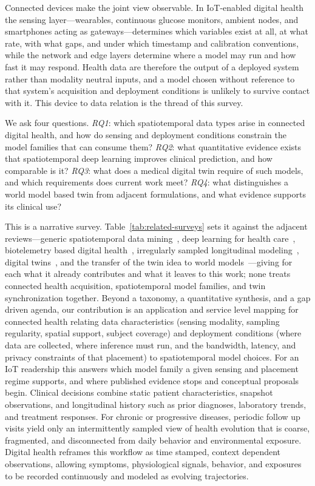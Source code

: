 \documentclass[journal]{IEEEtran}
\begin{document}
Connected devices make the joint view observable. In IoT-enabled digital health the sensing layer---wearables, continuous glucose monitors, ambient nodes, and smartphones acting as gateways---determines which variables exist at all, at what rate, with what gaps, and under which timestamp and calibration conventions, while the network and edge layers determine where a model may run and how fast it may respond. Health data are therefore the output of a deployed system rather than modality neutral inputs, and a model chosen without reference to that system's acquisition and deployment conditions is unlikely to survive contact with it. This device to data relation is the thread of this survey.

We ask four questions. \emph{RQ1}: which spatiotemporal data types arise in connected digital health, and how do sensing and deployment conditions constrain the model families that can consume them? \emph{RQ2}: what quantitative evidence exists that spatiotemporal deep learning improves clinical prediction, and how comparable is it? \emph{RQ3}: what does a medical digital twin require of such models, and which requirements does current work meet? \emph{RQ4}: what distinguishes a world model based twin from adjacent formulations, and what evidence supports its clinical use?

This is a narrative survey. Table~\ref{tab:related-surveys} sets it against the adjacent reviews---generic spatiotemporal data mining~\cite{wang2022deep,atluri2018stdm}, deep learning for health care~\cite{miotto2018deeplearning}, biotelemetry based digital health~\cite{Busnatu2022}, irregularly sampled longitudinal modeling~\cite{shukla2021irregular}, digital twins~\cite{Wang2023Survey,Sel2025VVUQ}, and the transfer of the twin idea to world models~\cite{Zheng2026DTtoWM}---giving for each what it already contributes and what it leaves to this work; none treats connected health acquisition, spatiotemporal model families, and twin synchronization together. Beyond a taxonomy, a quantitative synthesis, and a gap driven agenda, our contribution is an application and service level mapping for connected health relating data characteristics (sensing modality, sampling regularity, spatial support, subject coverage) and deployment conditions (where data are collected, where inference must run, and the bandwidth, latency, and privacy constraints of that placement) to spatiotemporal model choices. For an IoT readership this answers which model family a given sensing and placement regime supports, and where published evidence stops and conceptual proposals begin.
\else
Clinical decisions combine static patient characteristics, snapshot observations, and longitudinal history such as prior diagnoses, laboratory trends, and treatment responses. For chronic or progressive diseases, periodic follow up visits yield only an intermittently sampled view of health evolution that is coarse, fragmented, and disconnected from daily behavior and environmental exposure. Digital health reframes this workflow as time stamped, context dependent observations, allowing symptoms, physiological signals, behavior, and exposures to be recorded continuously and modeled as evolving trajectories.
\end{document}
